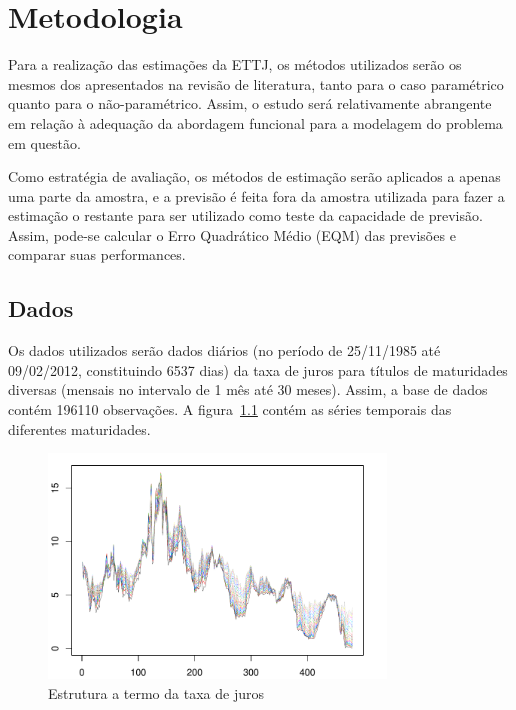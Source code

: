 \documentclass[
	12pt,				%
	openright,			%
	oneside,			%
	a4paper,			%
	english,			%
	brazil				%
	]{dissertacao-ufrgs-abntex2}
\begin{document}

\chapter{Metodologia} \label{ch:metodologia}

Para a realização das estimações da ETTJ, os métodos utilizados serão os mesmos dos apresentados na revisão de literatura, tanto para o caso paramétrico quanto para o não-paramétrico. Assim, o estudo será relativamente abrangente em relação à adequação da abordagem funcional para a modelagem do problema em questão.

Como estratégia de avaliação, os métodos de estimação serão aplicados a apenas uma parte da amostra, e a previsão é feita fora da amostra utilizada para fazer a estimação o restante para ser utilizado como teste da capacidade de previsão. Assim, pode-se calcular o Erro Quadrático Médio (EQM) das previsões e comparar suas performances. 

\section{Dados}

Os dados utilizados serão dados diários (no período de 25/11/1985 até 09/02/2012, constituindo 6537 dias) da taxa de juros para títulos de maturidades diversas (mensais no intervalo de 1 mês até 30 meses).  Assim, a base de dados contém 196110 observações. A figura~\ref{fig-est-termo} contém as séries temporais das diferentes maturidades.
\begin{figure}[h!] \label{fig-est-termo}
  \centering
    \includegraphics[width=0.8\textwidth]{anexos/taxas_juro}
  \caption{Estrutura a termo da taxa de juros}
\end{figure}
\end{document}
